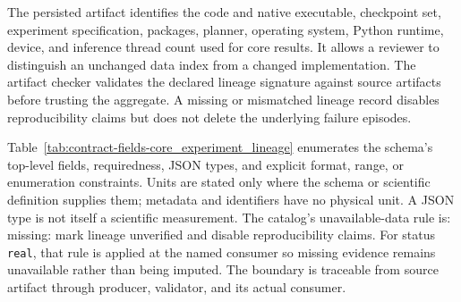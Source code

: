 The persisted artifact identifies the code and native executable, checkpoint set, experiment specification, packages, planner, operating system, Python runtime, device, and inference thread count used for core results. It allows a reviewer to distinguish an unchanged data index from a changed implementation. The artifact checker validates the declared lineage signature against source artifacts before trusting the aggregate. A missing or mismatched lineage record disables reproducibility claims but does not delete the underlying failure episodes.

Table~\ref{tab:contract-fields-core_experiment_lineage} enumerates the schema's top-level fields, requiredness, JSON types, and explicit format, range, or enumeration constraints. Units are stated only where the schema or scientific definition supplies them; metadata and identifiers have no physical unit. A JSON type is not itself a scientific measurement. The catalog's unavailable-data rule is: missing: mark lineage unverified and disable reproducibility claims. For status \texttt{real}, that rule is applied at the named consumer so missing evidence remains unavailable rather than being imputed. The boundary is traceable from source artifact through producer, validator, and its actual consumer.

